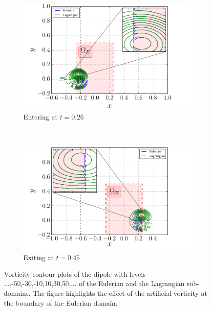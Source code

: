 	\begin{figure}[!p]
     \centering
     \begin{subfigure}[t]{0.48\textwidth}
             \includegraphics[width=\linewidth]{./figures/validation/cbConv/hybrid_doubleMonopoleConvection_entering2.pdf}
             \caption{Entering at $t=0.26$}
             \label{fig:hybrid_doubleMonopoleConvection_entering2}
     \end{subfigure}     
     ~ %
     \begin{subfigure}[t]{0.48\textwidth}
             \includegraphics[width=\linewidth]{./figures/validation/cbConv/hybrid_doubleMonopoleConvection_exiting.pdf}
             \caption{Exiting at $t=0.45$}
             \label{fig:hybrid_doubleMonopoleConvection_exiting}
     \end{subfigure}        
     
     \caption{Vorticity contour plots of the dipole with levels ...,-50,-30,-10,10,30,50,... of the Eulerian and the Lagrangian sub-domains. The figure highlights the effect of the artificial vorticity at the boundary of the Eulerian domain.}
     \label{fig:hybrid_doubleMonopoleConvection_ent_exi}
	\end{figure}
	
